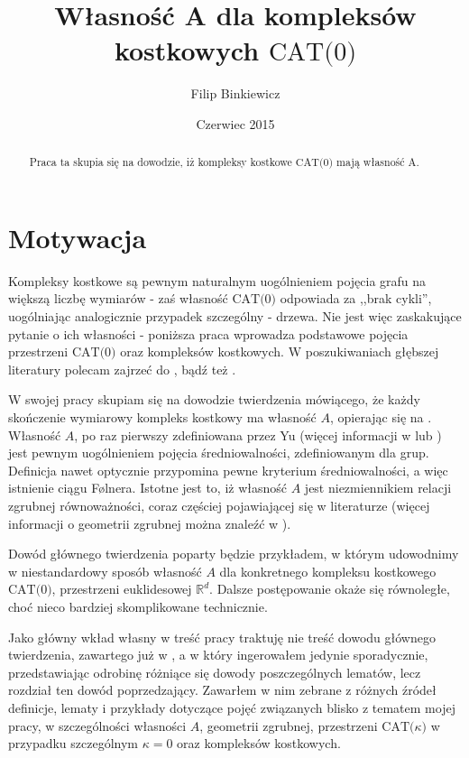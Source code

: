 \documentclass[licencjacka]{pracamgr}
\author{Filip Binkiewicz}
\title{Własność A dla kompleksów kostkowych $\text{CAT(0)}$}
\date{Czerwiec 2015}
\theoremstyle{definition}
\theoremstyle{definition}
\theoremstyle{definition}
\theoremstyle{definition}
\theoremstyle{definition}
\theoremstyle{plain}
\theoremstyle{plain}
\begin{document}
\maketitle


\begin{abstract}
	Praca ta skupia się na dowodzie, iż kompleksy kostkowe $\text{CAT(0)} $
	mają własność A.
\end{abstract}

\tableofcontents

\chapter*{Motywacja}

Kompleksy kostkowe są pewnym naturalnym uogólnieniem pojęcia grafu na większą liczbę 
wymiarów - zaś własność $ \text{CAT(0)} $ odpowiada za ,,brak cykli'', uogólniając 
analogicznie przypadek szczególny - drzewa. Nie jest 
więc zaskakujące pytanie o ich własności - poniższa praca wprowadza podstawowe 
pojęcia przestrzeni $ \text{CAT(0)} $ oraz kompleksów kostkowych. W poszukiwaniach głębszej 
literatury polecam zajrzeć do \cite{caprace}, \cite{schwer} bądź też \cite{sageev}.

W swojej pracy skupiam się na dowodzie twierdzenia mówiącego, że każdy skończenie 
wymiarowy kompleks kostkowy ma własność $ A $, opierając się na \cite{brodzki}. Własność $ A $, 
po raz pierwszy zdefiniowana przez Yu (więcej informacji w \cite{willett} lub 
\cite{nowak}) 
jest pewnym uogólnieniem pojęcia średniowalności, zdefiniowanym dla grup. Definicja 
nawet optycznie przypomina pewne kryterium średniowalności, a więc istnienie 
ciągu Følnera. Istotne jest to, iż własność $ A $ jest niezmiennikiem relacji 
zgrubnej równoważności, coraz częściej pojawiającej się w literaturze (więcej informacji 
o geometrii zgrubnej można znaleźć w \cite{roe}).

Dowód głównego twierdzenia poparty będzie przykładem, w którym udowodnimy w niestandardowy 
sposób własność $ A $ dla konkretnego kompleksu kostkowego $ \text{CAT(0)} $, 
przestrzeni euklidesowej $ \mathbb{R}^d $. Dalsze postępowanie okaże się równoległe, choć 
nieco bardziej skomplikowane technicznie. 

Jako główny wkład własny w treść pracy traktuję nie treść dowodu głównego twierdzenia, 
zawartego już w \cite{brodzki}, a w który ingerowałem jedynie sporadycznie, przedstawiając 
odrobinę różniące się dowody poszczególnych lematów, lecz rozdział ten dowód poprzedzający. 
Zawarłem w nim zebrane z różnych źródeł definicje, lematy i przykłady dotyczące pojęć 
związanych blisko z tematem mojej pracy, w szczególności własności $ A $, geometrii zgrubnej, 
przestrzeni 
$ \text{CAT(} \kappa \text{)} $ w przypadku szczególnym $ \kappa = 0 $ oraz kompleksów 
kostkowych. 
\end{document}
